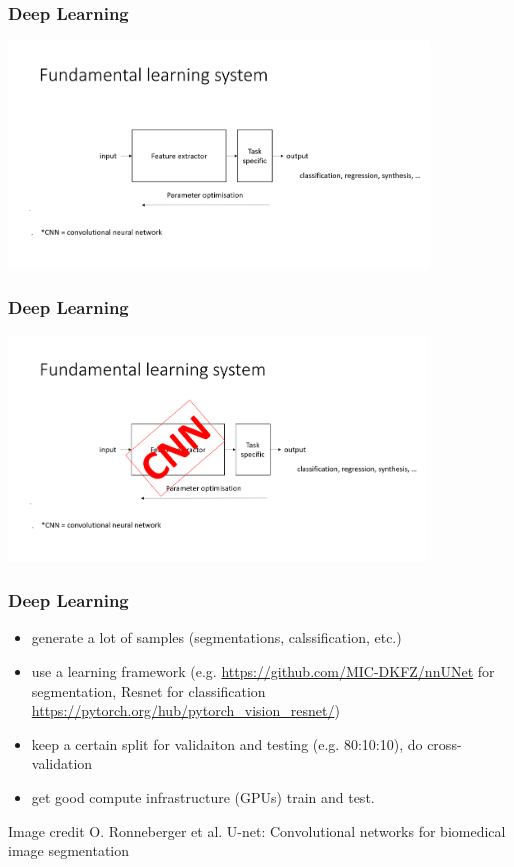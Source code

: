 \begin{frame}
    \frametitle{Deep Learning}
    \includegraphics[height=6cm]{img/woCNN.png}
\end{frame}

\begin{frame}
    \frametitle{Deep Learning}
    \includegraphics[height=6cm]{img/wCNN.png}
\end{frame}

\begin{frame}
    \frametitle{Deep Learning}
    \begin{itemize}
        \item generate a lot of samples (segmentations, calssification, etc.)
        \item use a learning framework (e.g. \url{https://github.com/MIC-DKFZ/nnUNet} for segmentation, Resnet for classification \url{https://pytorch.org/hub/pytorch_vision_resnet/})
        \item keep a certain split for validaiton and testing (e.g. 80:10:10), do cross-validation
        \item get good compute infrastructure (GPUs) train and test.
    \end{itemize}
    \begin{center}
{\tiny Image credit O. Ronneberger et al. U-net: Convolutional networks for biomedical image segmentation}
 \end{center}
\end{frame}

